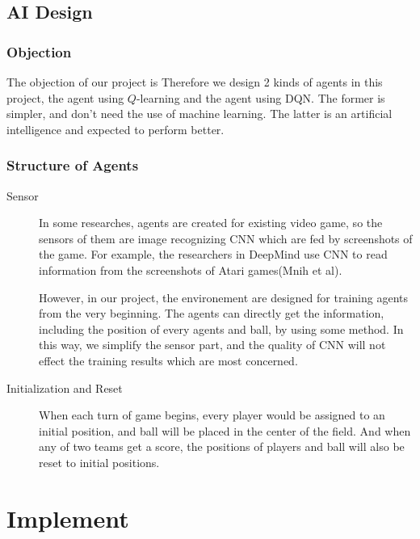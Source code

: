 \documentclass[14pt]{extarticle}
\begin{document}
\subsection{AI Design}
\subsubsection{Objection}
The objection of our project is %
Therefore we design 2 kinds of agents in this project, the agent using $Q$-learning and the agent using DQN. The former is simpler, and don't need the use of machine learning. The latter is an artificial intelligence and expected to perform better.
\subsubsection{Structure of Agents}

\begin{description}
	\item[Sensor]
    In some researches, agents are created for existing video game, so the sensors of them are image recognizing CNN which are fed by screenshots of the game. For example, the researchers in DeepMind use CNN to read information from the screenshots of Atari games(Mnih et al).

    However, in our project, the environement are designed for training agents from the very beginning. The agents can directly get the information, including the position of every agents and ball, by using some method. In this way, we simplify the sensor part, and the quality of CNN will not effect the training results which are most concerned.
    
	\item[Initialization and Reset]
    When each turn of game begins, every player would be assigned to an initial position, and ball will be placed in the center of the field. And when any of two teams get a score, the positions of players and ball will also be reset to initial positions.
    
\end{description}




\section{Implement}
\end{document}
